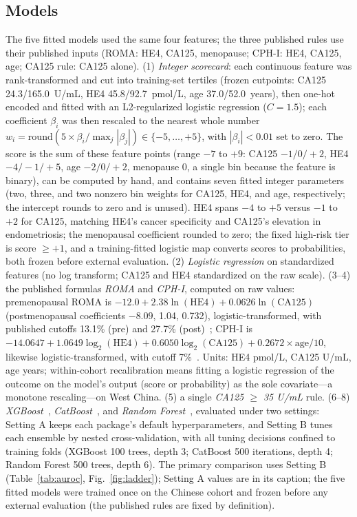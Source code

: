 \documentclass[conference]{IEEEtran}
\begin{document}
\subsection{Models}\label{sec:models}

The five fitted models used the same four features; the three
published rules use their published inputs (ROMA: HE4, CA125,
menopause; CPH-I: HE4, CA125, age; CA125 rule: CA125 alone).
(1) \emph{Integer
scorecard}:
each continuous feature was rank-transformed and cut into training-set
tertiles (frozen cutpoints: CA125 24.3/165.0~U/mL, HE4 45.8/92.7~pmol/L,
age 37.0/52.0~years), then one-hot encoded and fitted with an
L2-regularized logistic regression ($C=1.5$); each coefficient $\beta_i$
was then rescaled to the nearest whole number
$w_i=\mathrm{round}(5\times\beta_i/\max_j|\beta_j|)\in\{-5,\ldots,+5\}$,
with $|\beta_i|<0.01$ set to zero. The score is the sum of these feature
points (range $-7$ to $+9$: CA125 $-1/0/+2$, HE4 $-4/-1/+5$, age
$-2/0/+2$, menopause $0$, a single bin because the feature is
binary), can be computed by hand, and contains
seven fitted integer parameters
(two, three, and two nonzero bin weights for CA125, HE4, and age,
respectively; the intercept rounds to zero and is unused). HE4 spans
$-4$ to $+5$ versus $-1$ to $+2$ for CA125, matching HE4's cancer
specificity and CA125's elevation in endometriosis; the menopausal
coefficient rounded to zero; the fixed high-risk
tier is score $\ge +1$, and a training-fitted logistic map converts
scores to probabilities, both frozen before external evaluation.
(2) \emph{Logistic regression} on standardized features (no log
transform; CA125 and HE4 standardized on the raw scale). (3--4) the
published formulas \emph{ROMA} and \emph{CPH-I}, computed on raw values:
premenopausal ROMA is $-12.0+2.38\ln(\mathrm{HE4})
+0.0626\ln(\mathrm{CA125})$ (postmenopausal coefficients $-8.09$,
1.04, 0.732), logistic-transformed, with published cutoffs 13.1\%
(pre) and 27.7\% (post)~\cite{moore2011}; \mbox{CPH-I} is $-14.0647
+1.0649\log_2(\mathrm{HE4})+0.6050\log_2(\mathrm{CA125})
+0.2672\times\mathrm{age}/10$, likewise logistic-transformed, with
cutoff 7\%~\cite{karlsen2015}. Units: HE4 pmol/L, CA125 U/mL, age
years; within-cohort recalibration
means fitting a logistic regression of the outcome on the model's
output (score or probability) as the sole covariate---a monotone
rescaling---on West China.
(5) a single \emph{CA125 $\ge$ 35 U/mL} rule. (6--8) \emph{XGBoost}~\cite{chen2016},
\emph{CatBoost}~\cite{prokhorenkova2018}, and \emph{Random Forest}~\cite{breiman2001}, evaluated under two
settings: Setting A keeps each package's default hyperparameters, and Setting B tunes each
ensemble by nested cross-validation, with all tuning decisions confined
to training folds (XGBoost 100 trees, depth 3; CatBoost 500 iterations,
depth 4; Random Forest 500 trees, depth 6).
The primary comparison uses Setting B (Table~\ref{tab:auroc},
Fig.~\ref{fig:ladder}); Setting A values are in its
caption; the five fitted models were trained once on the Chinese
cohort and
frozen before any external evaluation (the published rules are fixed
by definition).
\end{document}
